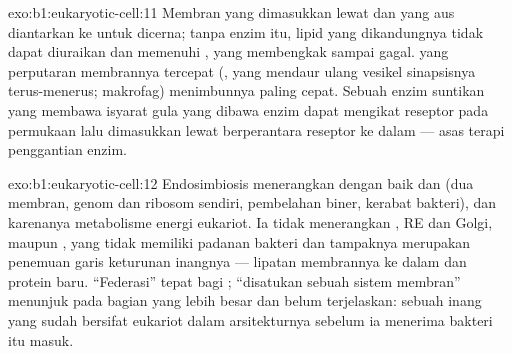 \begin{solution}{exo:b1:eukaryotic-cell:11}
Membran yang dimasukkan lewat  dan  yang aus
diantarkan ke  untuk dicerna; tanpa enzim itu, lipid yang
dikandungnya tidak dapat diuraikan dan memenuhi , yang
membengkak sampai  gagal.  yang perputaran membrannya tercepat
(, yang mendaur ulang vesikel sinapsisnya terus-menerus;
makrofag) menimbunnya paling cepat. Sebuah enzim suntikan yang membawa
isyarat gula yang dibawa enzim  dapat mengikat reseptor pada
permukaan  lalu dimasukkan lewat  berperantara reseptor
ke dalam  --- asas terapi penggantian enzim.
\end{solution}

\begin{solution}{exo:b1:eukaryotic-cell:12}
Endosimbiosis menerangkan dengan baik  dan  (dua
membran, genom dan ribosom sendiri, pembelahan biner, kerabat bakteri),
dan karenanya metabolisme energi eukariot. Ia tidak menerangkan ,
RE dan Golgi, maupun , yang tidak memiliki padanan bakteri
dan tampaknya merupakan penemuan garis keturunan inangnya --- lipatan
membrannya ke dalam dan protein baru. ``Federasi'' tepat bagi
; ``disatukan sebuah sistem membran'' menunjuk pada bagian
yang lebih besar dan belum terjelaskan: sebuah  inang yang sudah
bersifat eukariot dalam arsitekturnya sebelum ia menerima bakteri itu
masuk.
\end{solution}

